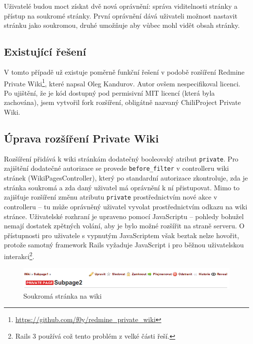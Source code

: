 \documentclass[thesis=B,czech]{FITthesis}[2012/05/02]
\begin{document}
Uživatelé budou moct získat dvě nová oprávnění: správa viditelnosti
stránky a přístup na soukromé stránky. První oprávnění dává uživateli
možnost nastavit stránku jako soukromou, druhé umožňuje aby vůbec mohl
vidět obsah stránky.

\subsection{Existující řešení}

V tomto případě už existuje poměrně funkční řešení v podobě rozšíření
Redmine Private Wiki\footnote{\url{https://github.com/f0y/redmine_private_wiki}},
které napsal Oleg Kandurov. Autor ovšem nespecifikoval licenci. Po
ujištění, že je kód dostupný pod permisivní MIT licencí (která byla
zachována), jsem vytvořil \gls{fork} rozšíření, obligátně nazvaný
ChiliProject Private Wiki.

\subsection{Úprava rozšíření Private Wiki}

Rozšíření přidává k wiki stránkám dodatečný booleovský atribut
\lstinline!private!. Pro zajištění dodatečné autorizace se provede
\lstinline!before_filter! v controlleru wiki stránek
(WikiPagesController), který po standardní autorizace zkontroluje, zda je
stránka soukromá a zda daný uživatel má oprávnění k ní přistupovat. Mimo
to zajišťuje rozšíření změnu atributu \lstinline!private!
prostřednictvím nové akce v controlleru -- tu může oprávněný uživatel
vyvolat prostřednictvím odkazu na wiki stránce. Uživatelské rozhraní je
upraveno pomocí JavaScriptu -- pohledy bohužel nemají dostatek zpětných
volání, aby je bylo možné rozšířit na straně serveru. O přístupnosti pro
uživatele s vypnutým JavaScriptem však beztak nelze hovořit, protože
samotný framework Rails vyžaduje JavaScript i pro běžnou uživatelskou
interakci\footnote{Rails 3 používá 
  což tento problém z velké části řeší.}.

\begin{figure}[tbp]
\centering
\centerline{\includegraphics[width=1.2\textwidth]{wiki-gui1.png}}
\caption{Soukromá stránka na wiki}
\label{fig:GUIPrivateWiki}
\end{figure}
\end{document}
